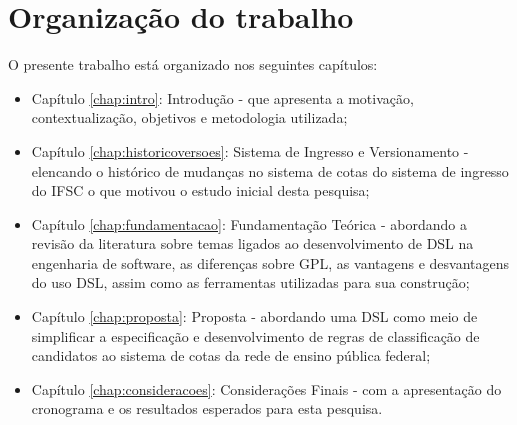 \section{Organização do trabalho}
\label{organizacao}

O presente trabalho está organizado nos seguintes capítulos:

\begin{itemize}
    \item Capítulo \ref{chap:intro}: Introdução - que apresenta a motivação, contextualização, objetivos e metodologia utilizada;
    \item Capítulo \ref{chap:historicoversoes}: Sistema de Ingresso e Versionamento - elencando o histórico de mudanças no sistema de cotas do sistema de ingresso do \gls{IFSC} o que motivou o estudo inicial desta pesquisa;
    \item Capítulo \ref{chap:fundamentacao}: Fundamentação Teórica - abordando a revisão da literatura sobre temas ligados ao desenvolvimento de \gls{DSL} na engenharia de software, as diferenças sobre \gls{GPL}, as vantagens e desvantagens do uso  \gls{DSL}, assim como as ferramentas utilizadas para sua construção;
    \item Capítulo \ref{chap:proposta}: Proposta - abordando uma \gls{DSL} como meio de simplificar a especificação e desenvolvimento de regras de classificação de candidatos ao sistema de cotas da rede de ensino pública federal;
    \item Capítulo \ref{chap:consideracoes}: Considerações Finais - com a apresentação do cronograma e os resultados esperados para esta pesquisa.
\end{itemize}
